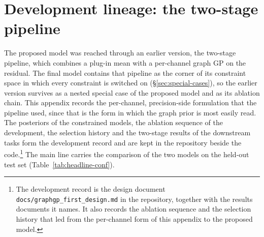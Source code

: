 \chapter{Development lineage: the two-stage pipeline}\label{app:lineage}
The proposed model was reached through an earlier version, the two-stage
pipeline, which combines a plug-in mean with a per-channel graph GP on the
residual. The final model contains that pipeline as the corner of its
constraint space in which every constraint is switched on
(\S\ref{sec:special-cases}), so the earlier version survives as a nested
special case of the proposed model and as its ablation chain. This appendix
records the per-channel, precision-side formulation that the pipeline used,
since that is the form in which the graph prior is most easily read. The
posteriors of the constrained models, the ablation sequence of the
development, the selection history and the two-stage results of the
downstream tasks form the development record and are kept in the repository
beside the code.\footnote{The development record is the design document
\texttt{docs/graphgp\_first\_design.md} in the repository, together with the
results documents it names. It also records the ablation sequence and the
selection history that led from the per-channel form of this appendix to the
proposed model.} The main line carries the comparison of the two models on
the held-out test set (Table~\ref{tab:headline-conf}).

